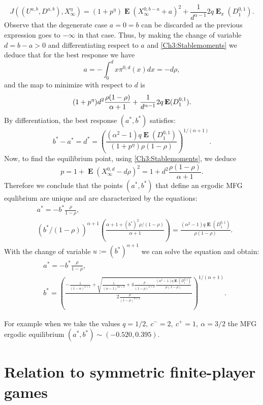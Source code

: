 \documentclass{article}
\newcommand\E{\operatorname{\mathbf{E}}}
\begin{document}
  
  
  \begin{equation*}
J((U^{a,b},D^{a,b}),X_{\infty}^{\eta})  =(1+p^{\eta} ) \E (X_{\infty}^{0,b-a}+a)^2+\frac{1}{d^{\alpha-1}}2q\E_{\pi}(D^{0,1}_1).   
\end{equation*}
Observe that the degenerate case $a=0=b$ can be discarded as the previous expression goes to $-\infty$ in that case.
Thus, by making the change of variable $d= b-a>0$ and differentiating respect to $a$ and \eqref{Ch3:Stablemoments} we deduce that for the best response  we have
%
\begin{equation*}
a=- \int_0^d x \pi^{0,d}(x)dx =-d\rho,
\end{equation*}
and the map to minimize with respect to $d$ is
\begin{equation*}
(1+p^\eta ) d^2{\rho(1-\rho)\over\alpha+1}+\frac{1}{d^{\alpha-1}}2q\E(D^{0,1}_1).    
\end{equation*}
By differentiation, the best response $(a^\ast,b^\ast)$ satisfies:
$$
b^\ast-a^\ast=d^*=\left(\frac{(\alpha^2-1)q \E(D^{0,1}_1)}{(1+p^\eta )\rho(1-\rho)}\right)^{1/(\alpha+1)}.
$$
Now, to find the equilibrium point, using \eqref{Ch3:Stablemoments}, we deduce
$$p=1+\E (X^{0,d}_{\infty}-d \rho)^2  = 1+ d^2 \frac{\rho (1-\rho)}{\alpha+1}. $$
Therefore we conclude that the points $(a^{\ast},b^{\ast})$ that define an ergodic MFG equlibrium are unique and are characterized by the equations:
\begin{align*}
   & a^{\ast}=-b^{\ast}\frac{\rho}{1-\rho} , \\
   & (b^*/(1-\rho))^{\alpha +1} \left(\frac{\alpha +1 +(b^*)^2 \rho/(1-\rho)}{\alpha +1}  \right)=\frac{(\alpha^2-1)q \E(D^{0,1}_1)}{\rho(1-\rho)}.
\end{align*}
With the change of variable $u:= (b^*)^{\alpha+1}$ we can solve the equation and obtain:
%
\begin{align*}
   & a^{\ast}=-b^{\ast}\frac{\rho}{1-\rho} , \\
   & b^*= \left(\frac{\displaystyle -\frac{1}{(1-\alpha)^{\alpha +1}} + \sqrt{\frac{1}{(\alpha -1)^{2\alpha +2} } +4 \frac{\rho}{(1-\rho)^{\alpha +2}} \frac{(\alpha^2-1)q \E(D^{0,1}_1)}{\rho(1-\rho)}    }}{\displaystyle 2 \frac{\rho}{(1-\rho)^{\alpha +2}} } \right)^{1/(\alpha+1)}.
\end{align*}

For example when we take the values $q=1/2, \ c^-=2, \ c^+=1, \ \alpha=3/2$ the MFG ergodic equilibrium $(a^{\ast},b^{\ast})\sim (-0.520,0.395)$.

\section{Relation to symmetric finite-player games }\label{C4:Nplayer}
\end{document}
